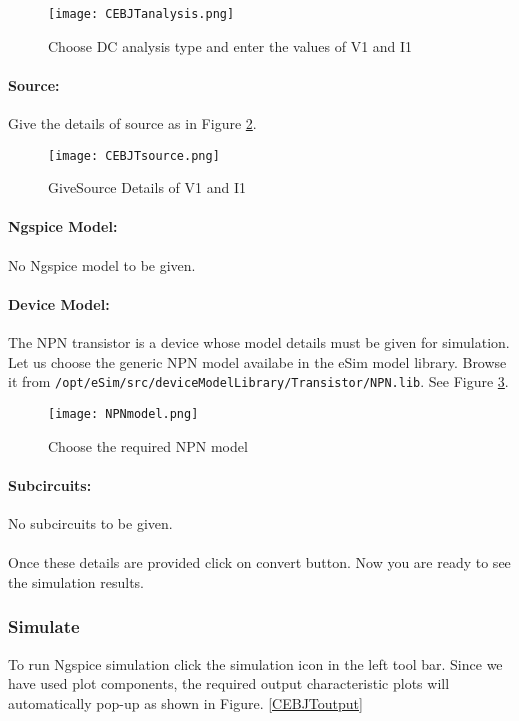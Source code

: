 \begin{figure}[h]
\centering
\texttt{[image: CEBJTanalysis.png]}
\caption{Choose DC analysis type and enter the values of V1 and I1}
\label{CEBJTanalysis}
\end{figure}

\paragraph{Source:} Give the details of source as in Figure \ref{CEBJTsource}.

\begin{figure}[h]
\centering
\texttt{[image: CEBJTsource.png]}
\caption{GiveSource Details of V1 and I1}
\label{CEBJTsource}
\end{figure}

\paragraph{Ngspice Model:} No Ngspice model to be given.

\paragraph{Device Model:} The NPN transistor is a device whose model details must be given for simulation. Let us choose the generic NPN model availabe in the eSim model library. Browse it from \texttt{/opt/eSim/src/deviceModelLibrary/Transistor/NPN.lib}. See Figure \ref{NPNmodel1}.

\begin{figure}[h]
\centering
\texttt{[image: NPNmodel.png]}
\caption{Choose the required NPN model}
\label{NPNmodel1}
\end{figure}

\paragraph{Subcircuits:} No subcircuits to be given.

\paragraph{}
 Once these details are provided click on convert button. %
Now you are ready to see the simulation results.

\subsubsection{Simulate} To run Ngspice simulation click the simulation icon in the left tool bar. Since we have used plot components, the required output characteristic plots will automatically pop-up as shown in Figure. \ref{CEBJToutput}


